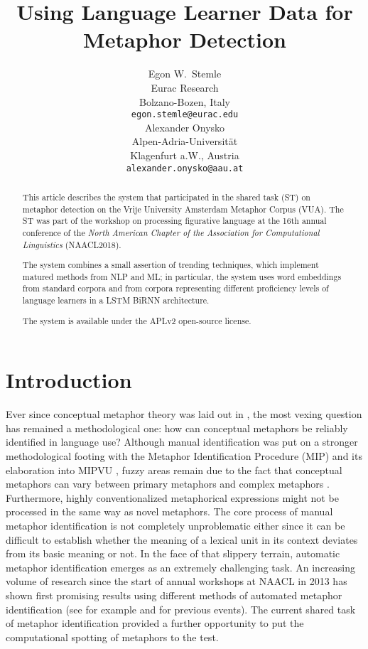 \documentclass[11pt,a4paper]{article}
\title{Using Language Learner Data for Metaphor Detection}
\author{Egon W.~Stemle \\
  Eurac Research \\
  Bolzano-Bozen, Italy \\
  {\tt egon.stemle@eurac.edu} \\\And
  Alexander Onysko \\
  Alpen-Adria-Universität \\
  Klagenfurt a.W., Austria \\
  {\tt alexander.onysko@aau.at} \\}
\date{}
\begin{document}
\maketitle
\begin{abstract}
This article describes the system that participated in the shared task (ST) on metaphor detection \cite{Leong2018} on the Vrije University Amsterdam Metaphor Corpus (VUA).
The ST was part of the workshop on processing figurative language at the 16th annual conference of the \emph{North American Chapter of the Association for Computational Linguistics} (NAACL2018).

The system combines a small assertion of trending techniques, which implement matured methods from NLP and ML; 
in particular, the system uses word embeddings from standard corpora and from corpora representing different proficiency levels of language learners in a LSTM BiRNN architecture.

The system is available under the APLv2 open-source license.
\end{abstract}


\section{Introduction} %
\label{sec:intro}
 
Ever since conceptual metaphor theory was laid out in , the most vexing question has remained a methodological one: how can conceptual metaphors be reliably identified in language use? Although manual identification was put on a stronger methodological footing with the Metaphor Identification Procedure (MIP) \cite{doi:10.1080/10926480709336752} and its elaboration into MIPVU \cite{Steen2010}, fuzzy areas remain due to the fact that conceptual metaphors can vary between primary metaphors and complex metaphors \cite[cf.][]{Grady1997}. 
Furthermore, highly conventionalized metaphorical expressions might not be processed in the same way as novel metaphors. The core process of manual metaphor identification is not completely unproblematic either since it can be difficult to establish whether the meaning of a lexical unit in its context deviates from its basic meaning or not. 
In the face of that slippery terrain, automatic metaphor identification emerges as an extremely challenging task. 
An increasing volume of research since the start of annual workshops at NAACL in 2013 has shown first promising results using different methods of automated metaphor identification (see for example %
 and 
 for previous events).
The current shared task of metaphor identification provided a further opportunity to put the computational spotting of metaphors to the test.
\end{document}
